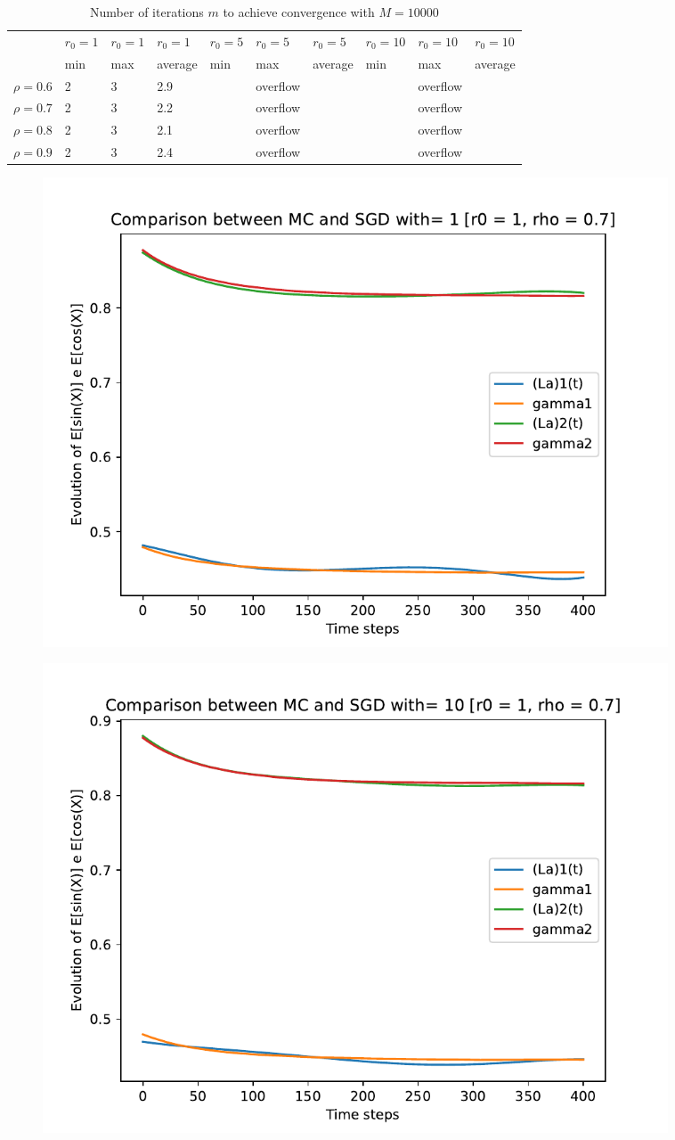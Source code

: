 \documentclass[a4paper,11pt,openright]{report}
\begin{document}
\begin{table}[H]
\centering
\addtolength{\leftskip}{-1.5cm}
\addtolength{\rightskip}{-1.5cm}
\begin{tabular}{|c|lllllllll|}
\hline
$ $ & $r_0 = 1$ & $r_0 = 1$ & $r_0 = 1$ & $r_0 = 5$ & $r_0 = 5$ & $r_0 = 5$ & $r_0 = 10$ & $r_0 = 10$ & $r_0 = 10$  \\
$ $ & min & max & average & min & max & average & min & max & average \\ 
\hline
$\rho = 0.6$ & 2 & 3 & 2.9 &  & overflow &  &  & overflow &  \\

$\rho = 0.7$ & 2 & 3 & 2.2 &  & overflow &  &  & overflow &  \\

$\rho = 0.8$ & 2 & 3 & 2.1 &  & overflow &  &  & overflow & \\

$\rho = 0.9$ & 2 & 3 & 2.4 &  & overflow &  &  & overflow & \\
\hline
\end{tabular}
\caption{Number of iterations $m$ to achieve convergence with $M = 10000$}
\end{table}
\begin{figure}[H]
\centering
\includegraphics[width=0.9\textwidth]{images/graphics T = 4/n = 5, M = 1 sine and cosine.pdf}
\end{figure}
\begin{figure}[H]
\centering
\includegraphics[width=0.9\textwidth]{images/graphics T = 4/n = 5, M = 10 sine and cosine.pdf}
\end{figure}
\end{document}
